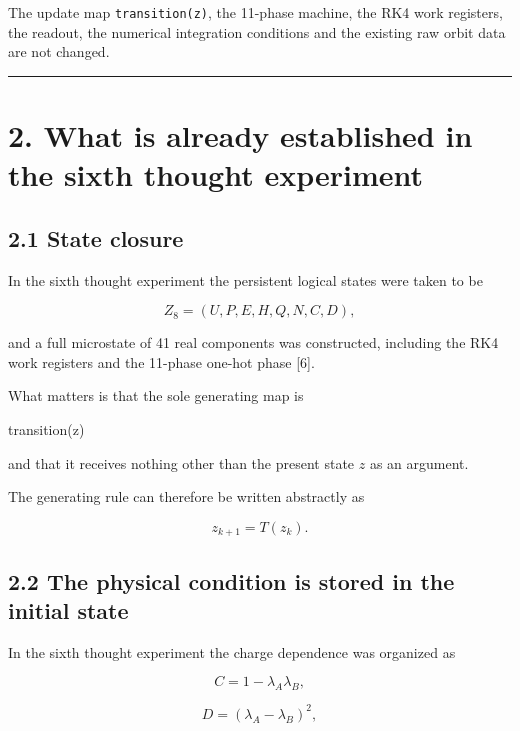\documentclass[
  a4paper,
]{article}
\newenvironment{Shaded}{}{}
\newcommand{\NormalTok}[1]{#1}
\begin{document}
The update map \texttt{transition(z)}, the 11-phase machine, the RK4
work registers, the readout, the numerical integration conditions and
the existing raw orbit data are not changed.

\begin{center}\rule{0.5\linewidth}{0.5pt}\end{center}

\section{2. What is already established in the sixth thought
experiment}\label{what-is-already-established-in-the-sixth-thought-experiment}

\subsection{2.1 State closure}\label{state-closure}

In the sixth thought experiment the persistent logical states were taken
to be

\[
Z_8=(U,P,E,H,Q,N,C,D),
\]

and a full microstate of 41 real components was constructed, including
the RK4 work registers and the 11-phase one-hot phase {[}6{]}.

What matters is that the sole generating map is

\begin{Shaded}
\begin{Highlighting}[]
\NormalTok{transition(z)}
\end{Highlighting}
\end{Shaded}

and that it receives nothing other than the present state \(z\) as an
argument.

The generating rule can therefore be written abstractly as

\[
\boxed{z_{k+1}=T(z_k)}.
\]

\subsection{2.2 The physical condition is stored in the initial
state}\label{the-physical-condition-is-stored-in-the-initial-state}

In the sixth thought experiment the charge dependence was organized as

\[
C=1-\lambda_A\lambda_B,
\]

\[
D=(\lambda_A-\lambda_B)^2,
\]
\end{document}
